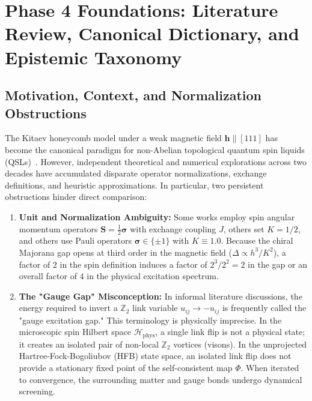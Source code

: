 \chapter{Phase 4 Foundations: Literature Review, Canonical Dictionary, and Epistemic Taxonomy}
\label{ch:phase4_foundations}

\section{Motivation, Context, and Normalization Obstructions}
\label{sec:phase4_motivation}

The Kitaev honeycomb model under a weak magnetic field $\bm{h} \parallel [111]$ has become the canonical paradigm for non-Abelian topological quantum spin liquids (QSLs)~\cite{Kitaev2006}. However, independent theoretical and numerical explorations across two decades have accumulated disparate operator normalizations, exchange definitions, and heuristic approximations. In particular, two persistent obstructions hinder direct comparison:
\begin{enumerate}
    \item \textbf{Unit and Normalization Ambiguity:} Some works employ spin angular momentum operators $\bm{S} = \frac{1}{2}\bm{\sigma}$ with exchange coupling $J$, others set $K = 1/2$, and others use Pauli operators $\bm{\sigma} \in \{\pm 1\}$ with $K \equiv 1.0$. Because the chiral Majorana gap opens at third order in the magnetic field ($\Delta \propto h^3 / K^2$), a factor of $2$ in the spin definition induces a factor of $2^3 / 2^2 = 2$ in the gap or an overall factor of $4$ in the physical excitation spectrum.
    \item \textbf{The "Gauge Gap" Misconception:} In informal literature discussions, the energy required to invert a $\mathbb{Z}_2$ link variable $u_{ij} \to -u_{ij}$ is frequently called the "gauge excitation gap." This terminology is physically imprecise. In the microscopic spin Hilbert space $\mathcal{H}_{\mathrm{phys}}$, a single link flip is not a physical state; it creates an isolated pair of non-local $\mathbb{Z}_2$ vortices (visons). In the unprojected Hartree-Fock-Bogoliubov (HFB) state space, an isolated link flip does not provide a stationary fixed point of the self-consistent map $\Phi$. When iterated to convergence, the surrounding matter and gauge bonds undergo dynamical screening.
\end{enumerate}

